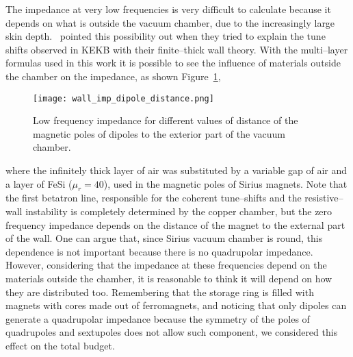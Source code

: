     The impedance at very low frequencies is very difficult to calculate because it depends on what is outside the vacuum chamber, due to the increasingly large skin depth.~ pointed this possibility out when they tried to explain the tune shifts observed in KEKB with their finite--thick wall theory. With the multi--layer formulas used in this work it is possible to see the influence of materials outside the chamber on the impedance, as shown Figure~\ref{fig:wall_imp_dipole_distance},
    \begin{figure}
        \centering
        \texttt{[image: wall\_imp\_dipole\_distance.png]}
        \caption{Low frequency impedance for different values of distance of the magnetic poles of dipoles to the exterior part of the vacuum chamber.}
        \label{fig:wall_imp_dipole_distance}
    \end{figure}
    where the infinitely thick layer of air was substituted by a variable gap of air and a layer of FeSi ($\mu_r = 40$), used in the magnetic poles of Sirius magnets. Note that the first betatron line, responsible for the coherent tune--shifts and the resistive--wall instability is completely determined by the copper chamber, but the zero frequency impedance depends on the distance of the magnet to the external part of the wall. One can argue that, since Sirius vacuum chamber is round, this dependence is not important because there is no quadrupolar impedance. However, considering that the impedance at these frequencies depend on the materials outside the chamber, it is reasonable to think it will depend on how they are distributed too. Remembering that the storage ring is filled with magnets with cores made out of ferromagnets, and noticing that only dipoles can generate a quadrupolar impedance because the symmetry of the poles of quadrupoles and sextupoles does not allow such component, we considered this effect on the total budget.

